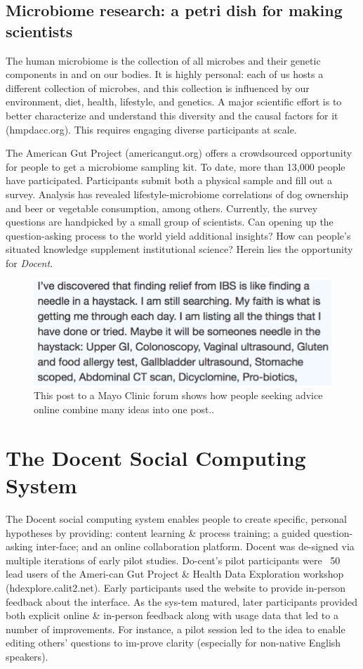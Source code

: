 \subsection{Microbiome research: a petri dish for making scientists}
The human microbiome is the collection of all microbes and
their genetic components in and on our bodies. It is highly
personal: each of us hosts a different collection of microbes,
and this collection is influenced by our environment, diet,
health, lifestyle, and genetics. A major scientific effort is to
better characterize and understand this diversity and the
causal factors for it (hmpdacc.org). This requires engaging
diverse participants at scale.

The American Gut Project (americangut.org) offers a
crowdsourced opportunity for people to get a microbiome
sampling kit. To date, more than 13,000 people have participated.
Participants submit both a physical sample and fill out
a survey. Analysis has revealed lifestyle-microbiome correlations
of dog ownership and beer or vegetable consumption,
among others. Currently, the survey questions are handpicked
by a small group of scientists. Can opening up the
question-asking process to the world yield additional insights?
How can people’s situated knowledge supplement institutional
science? Herein lies the opportunity for \textit{Docent}.

\begin{figure}[h] 
  \centering
  \includegraphics[width=1.0\textwidth]{figures/docent/fig-1.png}
  \caption[]
{This post to a Mayo Clinic forum shows how people
seeking advice online combine many ideas into one post..}
  \label{fig:docent-1}
\end{figure}


\section{The Docent Social Computing System}
The Docent social computing system enables people to create specific, personal hypotheses by providing: content learning \& process training; a guided question-asking inter-face; and an online collaboration platform. Docent was de-signed via multiple iterations of early pilot studies. Do-cent’s pilot participants were ~50 lead users of the Ameri-can Gut Project \& Health Data Exploration workshop (hdexplore.calit2.net). Early participants used the website to provide in-person feedback about the interface. As the sys-tem matured, later participants provided both explicit online \& in-person feedback along with usage data that led to a number of improvements. For instance, a pilot session led to the idea to enable editing others’ questions to im-prove clarity (especially for non-native English speakers).

